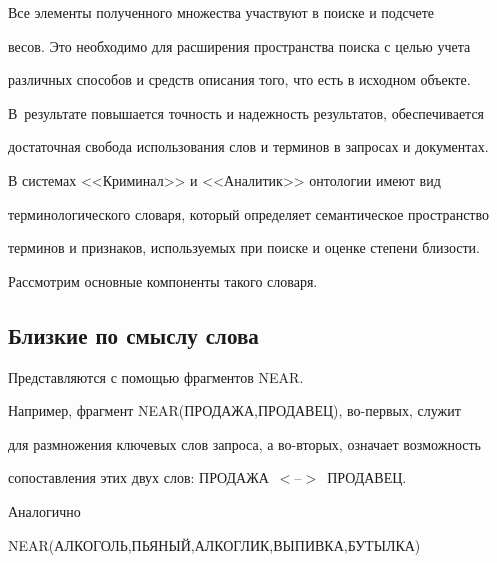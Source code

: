     Все элементы полученного множества участвуют в поиске и подсчете 


весов. Это необходимо для расширения пространства поиска с целью учета 


различных способов и средств описания того, что есть в исходном объекте. 


В~результате повышается точность и надежность результатов, обеспечивается 


достаточная свобода использования слов и терминов в запросах и документах.


    


    В системах <<Криминал>> и <<Аналитик>> онтологии имеют вид 


терминологического словаря, который определяет семантическое пространство 


терминов и признаков, используемых при поиске и оценке степени близости. 


Рассмотрим основные компоненты такого словаря.


    


    \subsection{Близкие по смыслу слова}


    


    Представляются с помощью фрагментов NEAR. 


    


    Например, фрагмент NEAR(ПРОДАЖА,ПРОДАВЕЦ), во-первых, служит 


для размножения ключевых слов запроса, а во-вторых, означает возможность 


сопоставления этих двух слов: ПРО\-ДА\-ЖА~$<$--$>$~ПРО\-ДА\-ВЕЦ.


    


    Аналогично 


    


     \smallskip


     


         {\small


    


    \noindent


    NEAR(АЛКОГОЛЬ,ПЬЯНЫЙ,АЛКОГЛИК,ВЫПИВКА,БУТЫЛКА) 


    }


